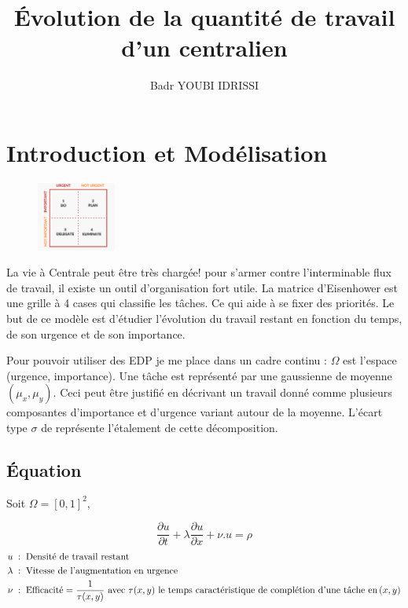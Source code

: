 \documentclass[french]{article}
\author{Badr YOUBI IDRISSI}
\title{\'Evolution de la quantité de travail d'un centralien}
\begin{document}
\maketitle
\section{Introduction et Modélisation}

    \begin{figure}
        \begin{center}
            \includegraphics[width=0.23\textwidth]{Figures/Eisenhower.png}
        \end{center}
    \end{figure}
    La vie à Centrale peut être très chargée! pour s'armer contre l'interminable 
    flux de travail, il existe un outil d'organisation fort utile.
    La matrice d'Eisenhower est une grille à 4 cases qui classifie les tâches. Ce qui 
    aide à se fixer des priorités. Le but de ce modèle est d'étudier
    l'évolution du travail restant en fonction du temps, de son urgence et de son importance.
    
    Pour pouvoir utiliser des EDP je me place dans un cadre continu : $\Omega$ est
     l'espace (urgence, importance). Une tâche est représenté par 
    une gaussienne de moyenne $(\mu_x,\mu_y)$.
    Ceci peut être justifié en décrivant un travail donné comme plusieurs composantes
     d'importance et d'urgence variant
    autour de la moyenne. L'écart type $\sigma$ de représente l'étalement de cette décomposition.

    \subsection{\'Equation}
    Soit $\Omega = [0,1]^2$,
    
    \begin{equation}\label{EDP}
        \frac{\partial u}{\partial t} + \lambda\frac{\partial u}{\partial x} + \nu.u = \rho 
    \end{equation}
    \begin{alignat*}{6}
        u \;:\; &\text{\;Densité de travail restant} \\
        \lambda \;:\; &\text{\;Vitesse de l'augmentation en urgence}\\
        \nu \;:\; &
        \text{\;Efficacité} = \frac{1}{\tau(x,y)} \text{ avec } \tau(x,y) 
        \text{ le temps caractéristique de complétion d'une tâche en} \,(x,y)
    \end{alignat*}
\end{document}
